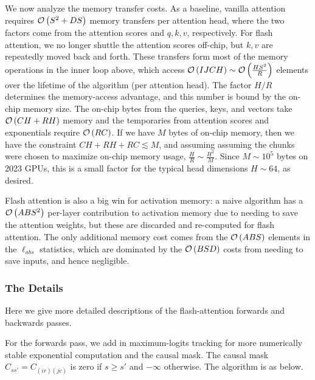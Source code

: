 We now analyze the memory transfer costs. As a baseline, vanilla attention requires $ \mathcal{O} \left( S
^{ 2 }+ DS \right)  $ memory transfers per attention head, where the two factors come from the
attention scores and $ q, k, v $, respectively.  For flash attention, we no longer shuttle the
attention scores off-chip, but $ k, v $ are repeatedly moved back and forth. These transfers form
most of the memory operations in the inner loop above, which access $ \mathcal{O} \left( IJCH \right) \sim
\mathcal{O} \left( \frac{ HS ^{ 2 } }{ R } \right)$ elements over the lifetime of the algorithm (per
attention head). The factor $ H/R $ determines the memory-access advantage, and this number is bound
by the on-chip memory size. The on-chip bytes from the queries, keys, and vectors take $ \mathcal{O}
\left( CH + RH \right)  $ memory and the temporaries from attention scores and exponentials require
$ \mathcal{O} \left( RC \right)$. If we have $ M $ bytes of on-chip memory, then we have the constraint $
CH + RH + RC \lesssim  M  $, and assuming assuming the chunks were chosen to maximize on-chip memory
usage, $ \frac{ H }{ R } \sim \frac{ H ^{ 2 } }{ M } $. Since $ M \sim 10 ^{ 5 } $ bytes on 2023
GPUs, this is a small factor for the typical head dimensions  $ H \sim 64 $, as desired.

Flash attention is also a big win for activation memory: a naive algorithm has a $ \mathcal{O} \left( ABS
^{ 2 } \right)  $ per-layer contribution to activation memory due to needing to save the attention
weights, but these are discarded and re-computed for flash attention.  The only additional memory
cost comes from the $ \mathcal{O} \left( ABS \right)  $ elements in the $ \ell _{ abs } $ statistics, which are
dominated by the $ \mathcal{O} \left( BSD \right)  $ costs from needing to save inputs, and hence negligible.


\subsubsection{The Details \label{subsubsec_fa_details}}

Here we give more detailed descriptions of the flash-attention forwards and backwards passes.

For the forwards pass, we add in maximum-logits tracking for more numerically stable exponential
computation and the causal mask. The causal mask $ C _{ s s' } = C _{ (ir)(jc) } $ is zero if $ s
\ge s' $ and $ -\infty $ otherwise. The algorithm is as below.

